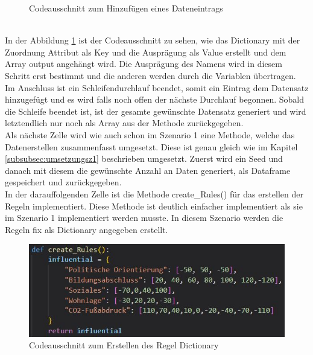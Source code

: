 \begin{onehalfspace}
\begin{figure}[h]
    \caption{Codeausschnitt zum Hinzufügen eines Dateneintrags}
    \label{fig:Sz2AddEntry}
\end{figure}\\
In der Abbildung \ref{fig:Sz2AddEntry} ist der Codeausschnitt zu sehen, wie das Dictionary mit der Zuordnung Attribut als Key und die Ausprägung als Value erstellt und dem Array \glqq{}output\grqq{} angehängt wird. Die Ausprägung des Namens wird in diesem Schritt erst bestimmt und die anderen werden durch die Variablen übertragen.
Im Anschluss ist ein Schleifendurchlauf beendet, somit ein Eintrag dem Datensatz hinzugefügt und es wird falls noch offen der nächste Durchlauf begonnen. Sobald die Schleife beendet ist, ist der gesamte gewünschte Datensatz generiert und wird letztendlich nur noch als Array aus der Methode zurückgegeben. \\
Als nächste Zelle wird wie auch schon im Szenario 1 eine Methode, welche das Datenerstellen zusammenfasst umgesetzt. Diese ist genau gleich wie im Kapitel \ref{subsubsec:umsetzungsz1} beschrieben umgesetzt. Zuerst wird ein Seed und danach mit diesem die gewünschte Anzahl an Daten generiert, als Dataframe gespeichert und zurückgegeben.\\ 
In der darauffolgenden Zelle ist die Methode \glqq{}create\_Rules()\grqq{} für das erstellen der Regeln implementiert. Diese Methode ist deutlich einfacher implementiert als sie im Szenario 1 implementiert werden musste. In diesem Szenario werden die Regeln fix als Dictionary angegeben erstellt.
\begin{figure}[h]
    \centering
    \includegraphics[width=16cm]{Diagramme/Sz2Regeln.JPG}
    \caption{Codeausschnitt zum Erstellen des Regel Dictionary}
    \label{fig:Sz2Regeln}
\end{figure}\\

\end{onehalfspace}
